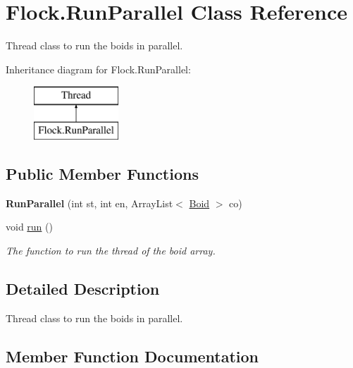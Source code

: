 \hypertarget{class_flock_1_1_run_parallel}{}\section{Flock.\+Run\+Parallel Class Reference}
\label{class_flock_1_1_run_parallel}


Thread class to run the boids in parallel.  


Inheritance diagram for Flock.\+Run\+Parallel\+:\begin{figure}[H]
\begin{center}
\leavevmode
\includegraphics[height=2.000000cm]{class_flock_1_1_run_parallel}
\end{center}
\end{figure}
\subsection*{Public Member Functions}
\begin{DoxyCompactItemize}
\item 
\mbox{\label{class_flock_1_1_run_parallel_a122589c3f715c5d43214308a83e9e273}} 
{\bfseries Run\+Parallel} (int st, int en, Array\+List$<$ \mbox{\hyperlink{class_boid}{Boid}} $>$ co)
\item 
void \mbox{\hyperlink{class_flock_1_1_run_parallel_a82267b3ef7626f67cb70d5c7bfa65fd1}{run}} ()
\begin{DoxyCompactList}\small\item\em The function to run the thread of the boid array. \end{DoxyCompactList}\end{DoxyCompactItemize}


\subsection{Detailed Description}
Thread class to run the boids in parallel. 

\subsection{Member Function Documentation}
\mbox{\label{class_flock_1_1_run_parallel_a82267b3ef7626f67cb70d5c7bfa65fd1}} 

